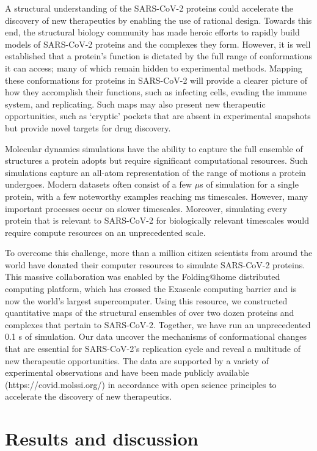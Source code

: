 \documentclass[../main.tex]{subfiles}
\begin{document}
    A structural understanding of the SARS-CoV-2 proteins could accelerate the discovery of new therapeutics by enabling the use of rational design\cite{ferreira_molecular_2015}. Towards this end, the structural biology community has made heroic efforts to rapidly build models of SARS-CoV-2 proteins and the complexes they form. However, it is well established that a protein’s function is dictated by the full range of conformations it can access; many of which remain hidden to experimental methods. Mapping these conformations for proteins in SARS-CoV-2 will provide a clearer picture of how they accomplish their functions, such as infecting cells, evading the immune system, and replicating. Such maps may also present new therapeutic opportunities, such as ‘cryptic’ pockets that are absent in experimental snapshots but provide novel targets for drug discovery.

    Molecular dynamics simulations have the ability to capture the full ensemble of structures a protein adopts but require significant computational resources. Such simulations capture an all-atom representation of the range of motions a protein undergoes. Modern datasets often consist of a few $\mu$s of simulation for a single protein, with a few noteworthy examples reaching ms timescales. However, many important processes occur on slower timescales. Moreover, simulating every protein that is relevant to SARS-CoV-2 for biologically relevant timescales would require compute resources on an unprecedented scale.

    To overcome this challenge, more than a million citizen scientists from around the world have donated their computer resources to simulate SARS-CoV-2 proteins. This massive collaboration was enabled by the Folding@home distributed computing platform, which has crossed the Exascale computing barrier and is now the world’s largest supercomputer. Using this resource, we constructed quantitative maps of the structural ensembles of over two dozen proteins and complexes that pertain to SARS-CoV-2. Together, we have run an unprecedented 0.1 s of simulation. Our data uncover the mechanisms of conformational changes that are essential for SARS-CoV-2’s replication cycle and reveal a multitude of new therapeutic opportunities. The data are supported by a variety of experimental observations and have been made publicly available (https://covid.molssi.org/) in accordance with open science principles to accelerate the discovery of new therapeutics.

    \section{Results and discussion}
\end{document}

